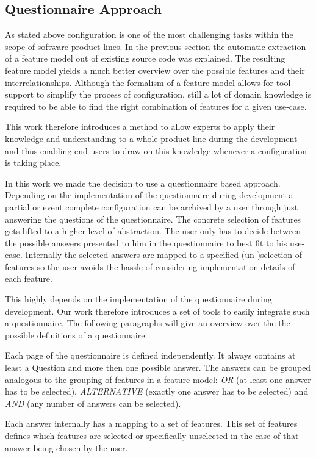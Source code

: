 \subsection{Questionnaire Approach}
As stated above configuration is one of the most challenging tasks within the scope of software product lines. In the previous section the automatic extraction of a feature model out of existing source code was explained. The resulting feature model yields a much better overview over the possible features and their interrelationships. Although the formalism of a feature model allows for tool support to simplify the process of configuration, still a lot of domain knowledge is required to be able to find the right combination of features for a given use-case.

This work therefore introduces a method to allow experts to apply their knowledge and understanding to a whole product line during the development and thus enabling end users to draw on this knowledge whenever a configuration is taking place.

In this work we made the decision to use a questionnaire based approach. Depending on the implementation of the questionnaire during development a partial or event complete configuration can be archived by a user through just answering the questions of the questionnaire. The concrete selection of features gets lifted to a higher level of abstraction. The user only has to decide between the possible answers presented to him in the questionnaire to best fit to his use-case. Internally the selected answers are mapped to a specified (un-)selection of features so the user avoids the hassle of considering implementation-details of each feature.

This highly depends on the implementation of the questionnaire during development. Our work therefore introduces a set of tools to easily integrate such a questionnaire. The following paragraphs will give an overview over the the possible definitions of a questionnaire.

Each page of the questionnaire is defined independently. It always contains at least a Question and more then one possible answer. The answers can be grouped analogous to the grouping of features in a feature model: \textit{OR} (at least one answer has to be selected), \textit{ALTERNATIVE} (exactly one answer has to be selected) and \textit{AND} (any number of answers can be selected).

Each answer internally has a mapping to a set of features. This set of features defines which features are selected or specifically unselected in the case of that answer being chosen by the user.

